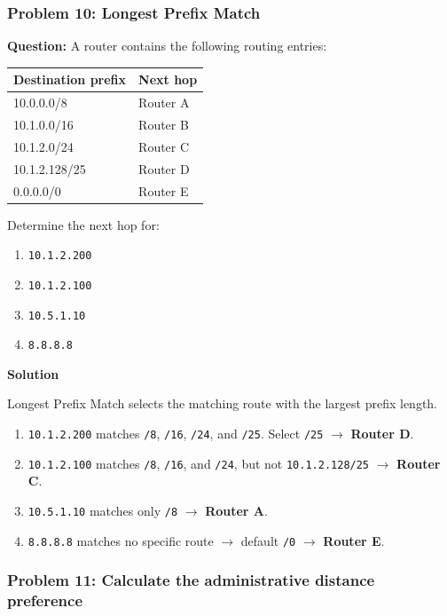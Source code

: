 \subsubsection*{Problem 10: Longest Prefix Match}

\textbf{Question:} A router contains the following routing entries:

\begin{center}
\begin{tabularx}{\linewidth}{p{5.5cm} X}
\toprule
\textbf{Destination prefix} & \textbf{Next hop} \\
\midrule
10.0.0.0/8 & Router A \\
10.1.0.0/16 & Router B \\
10.1.2.0/24 & Router C \\
10.1.2.128/25 & Router D \\
0.0.0.0/0 & Router E \\
\bottomrule
\end{tabularx}
\end{center}

Determine the next hop for:

\begin{enumerate}
\item \texttt{10.1.2.200}
\item \texttt{10.1.2.100}
\item \texttt{10.5.1.10}
\item \texttt{8.8.8.8}
\end{enumerate}

\textbf{Solution}

Longest Prefix Match selects the matching route with the largest prefix length.

\begin{enumerate}
\item \texttt{10.1.2.200} matches \texttt{/8}, \texttt{/16}, \texttt{/24}, and \texttt{/25}. Select \texttt{/25} $\to$ \textbf{Router D}.
\item \texttt{10.1.2.100} matches \texttt{/8}, \texttt{/16}, and \texttt{/24}, but not \texttt{10.1.2.128/25} $\to$ \textbf{Router C}.
\item \texttt{10.5.1.10} matches only \texttt{/8} $\to$ \textbf{Router A}.
\item \texttt{8.8.8.8} matches no specific route $\to$ default \texttt{/0} $\to$ \textbf{Router E}.
\end{enumerate}

\subsubsection*{Problem 11: Calculate the administrative distance preference}

